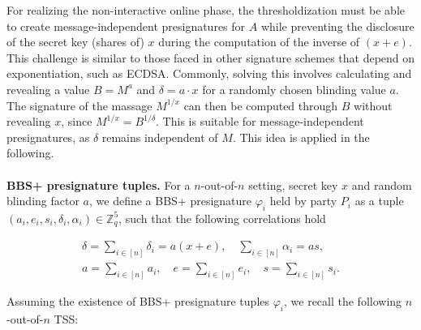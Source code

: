 For realizing the non-interactive online phase, the thresholdization must be able to create message-independent presignatures for $A$ while preventing the disclosure of the secret key (shares of) $x$ during the computation of the inverse of $(x+e)$. This challenge is similar to those faced in other signature schemes that depend on exponentiation, such as ECDSA. Commonly, solving this involves calculating and revealing a value $B = M^a$ and $\delta = a\cdot x$ for a randomly chosen blinding value $a$. The signature of the massage $M^{1/x}$ can then be computed through $B$ without revealing $x$, since $M^{1/x} = B^{1/\delta}$. This is suitable for message-independent presignatures, as $\delta$ remains independent of $M$. This idea is applied in the following.
\\\\
\textbf{BBS+ presignature tuples.} For a $n$-out-of-$n$ setting, secret key $x$ and random blinding factor $a$, we define a BBS+ presignature $\varphi_i$ held by party $P_i$ as a tuple $(a_i,e_i,s_i,\delta_i,\alpha_i) \in \mathbb{Z}^5_q$, such that the following correlations hold

\begin{equation}
\begin{array}{l}
\delta=\sum\limits_{i \in[n]} \delta_i=a(x+e), \quad
\sum\limits_{i \in[n]} \alpha_i=as, \\
a=\sum\limits_{i \in[n]} a_i, \quad e=\sum\limits_{i \in[n]} e_i, \quad s=\sum\limits_{i \in[n]} s_i.
\end{array}
\label{eq:req_correlations}
\end{equation}

Assuming the existence of BBS+ presignature tuples $\varphi_i$, we recall the following $n$-out-of-$n$ TSS:

